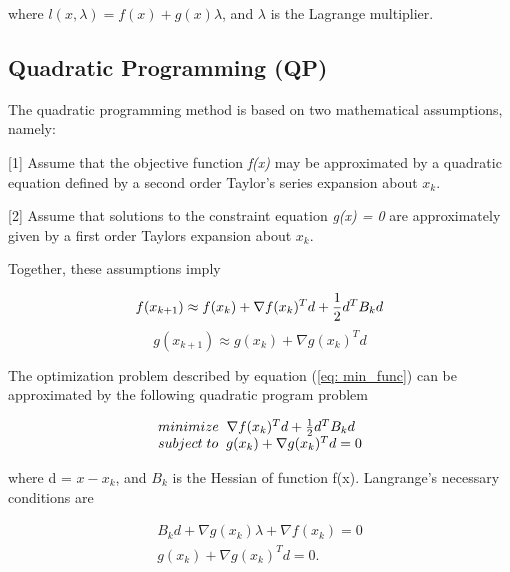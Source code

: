\noindent
where $ l(x, \lambda) = f(x) + g(x) \lambda$,
and $\lambda$ is the Lagrange multiplier.

\subsection{Quadratic Programming (QP)}

\vspace{0.15 in}
\noindent\hspace{0.5 in}
The quadratic programming method is based on two mathematical assumptions,
namely:

\vspace{0.10 in}
\begin{description}
\item{[1]}
Assume that the objective function {\em f(x)} may be
approximated by a quadratic equation defined by a
second order Taylor's series expansion about $x_k$.
\vspace{0.10 in}
\item{[2]}
Assume that solutions to the constraint equation {\em g(x) = 0} are
approximately given by a first order Taylors expansion about $x_k$.
\end{description}

\vspace{0.10 in}\noindent
Together, these assumptions imply

\[ f(x_{k+1}) \approx f(x_k) + \nabla f(x_k)^T d + {1 \over 2} d^T B_k d \] 
\[ g(x_{k+1}) \approx g(x_k) + \nabla g(x_k)^T d \]

\vspace{0.15 in}\noindent
The optimization problem described by equation (\ref{eq: min_func}) can
be approximated by the following quadratic program problem

\begin{equation}
\begin{array}{l}
minimize \;\;  \nabla f(x_k)^T d + {1 \over 2} d^T B_k d \\
subject \; to \;\; g(x_k) + \nabla g(x_k)^T d = 0
\end{array}
\label{eq: min_QP}
\end{equation}

\vspace{0.15 in}\noindent
where d = $x - x_k$, and $B_k$ is the Hessian of function f(x). 
Langrange's necessary conditions are 

\begin{equation}
\begin{array}{l}
B_k d  + \nabla g(x_k) \lambda + \nabla f(x_k) = 0 \\
g(x_k) + \nabla g(x_k)^T d = 0.
\end{array}
\label{eq: min_QPLagrange}
\end{equation}

